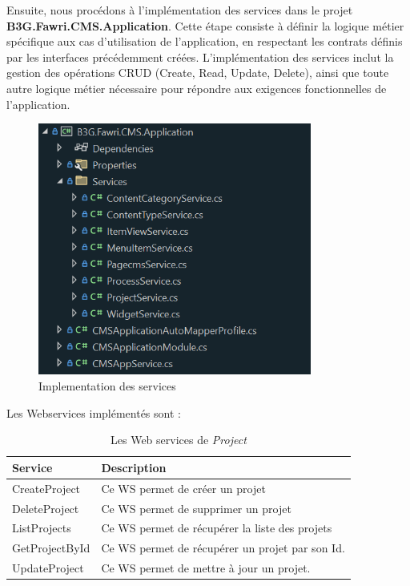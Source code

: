 Ensuite, nous procédons à l'implémentation des services dans le projet \textbf{B3G.Fawri.CMS.Application}. Cette étape consiste à définir la logique métier spécifique aux cas d'utilisation de l'application, en respectant les contrats définis par les interfaces précédemment créées. L'implémentation des services inclut la gestion des opérations CRUD (Create, Read, Update, Delete), ainsi que toute autre logique métier nécessaire pour répondre aux exigences fonctionnelles de l'application.

\begin{figure}[H] 
    \centering
    \includegraphics[width=9cm]{Figures/services impl.PNG}
        \caption{Implementation des services}
\end{figure}


Les Webservices implémentés sont : 


\begin{table}[H]
    \centering
    \begin{tabular}{|m{5cm}|m{10cm}|}
        \hline
          \textbf{Service} & \textbf{Description} \\
        \hline
          CreateProject & Ce WS permet de créer un projet \\
        \hline
          DeleteProject & Ce WS permet de supprimer un projet \\
        \hline
          ListProjects & Ce WS permet de récupérer la liste des projets \\
        \hline
        GetProjectById & Ce WS permet de récupérer un projet par son Id.\\
        \hline 
        UpdateProject & Ce WS permet de mettre à jour un projet.\\
        \hline
    \end{tabular}
    \caption{Les Web services de \textit{Project}}
\end{table}



